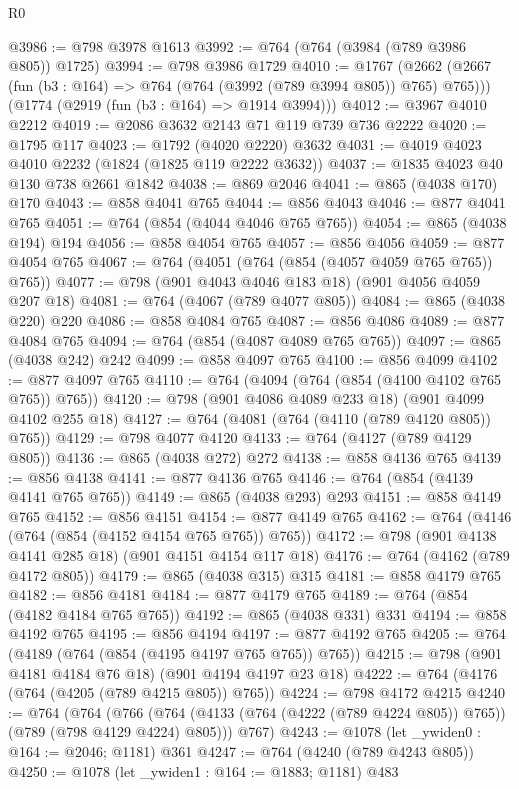 \begin{lexlean}{R0}
\begin{coremodule}
@3986 := @798 @3978 @1613
@3992 := @764 (@764 (@3984 (@789 @3986 @805)) @1725)
@3994 := @798 @3986 @1729
@4010 := @1767
    (@2662 (@2667 (fun (b3 : @164) => @764 (@764 (@3992 (@789 @3994 @805)) @765) @765)))
    (@1774 (@2919 (fun (b3 : @164) => @1914 @3994)))
@4012 := @3967 @4010 @2212
@4019 := @2086 @3632 @2143 @71 @119 @739 @736 @2222
@4020 := @1795 @117
@4023 := @1792 (@4020 @2220) @3632
@4031 := @4019 @4023 @4010 @2232 (@1824 (@1825 @119 @2222 @3632))
@4037 := @1835 @4023 @40 @130 @738 @2661 @1842
@4038 := @869 @2046
@4041 := @865 (@4038 @170) @170
@4043 := @858 @4041 @765
@4044 := @856 @4043
@4046 := @877 @4041 @765
@4051 := @764 (@854 (@4044 @4046 @765 @765))
@4054 := @865 (@4038 @194) @194
@4056 := @858 @4054 @765
@4057 := @856 @4056
@4059 := @877 @4054 @765
@4067 := @764 (@4051 (@764 (@854 (@4057 @4059 @765 @765)) @765))
@4077 := @798 (@901 @4043 @4046 @183 @18) (@901 @4056 @4059 @207 @18)
@4081 := @764 (@4067 (@789 @4077 @805))
@4084 := @865 (@4038 @220) @220
@4086 := @858 @4084 @765
@4087 := @856 @4086
@4089 := @877 @4084 @765
@4094 := @764 (@854 (@4087 @4089 @765 @765))
@4097 := @865 (@4038 @242) @242
@4099 := @858 @4097 @765
@4100 := @856 @4099
@4102 := @877 @4097 @765
@4110 := @764 (@4094 (@764 (@854 (@4100 @4102 @765 @765)) @765))
@4120 := @798 (@901 @4086 @4089 @233 @18) (@901 @4099 @4102 @255 @18)
@4127 := @764 (@4081 (@764 (@4110 (@789 @4120 @805)) @765))
@4129 := @798 @4077 @4120
@4133 := @764 (@4127 (@789 @4129 @805))
@4136 := @865 (@4038 @272) @272
@4138 := @858 @4136 @765
@4139 := @856 @4138
@4141 := @877 @4136 @765
@4146 := @764 (@854 (@4139 @4141 @765 @765))
@4149 := @865 (@4038 @293) @293
@4151 := @858 @4149 @765
@4152 := @856 @4151
@4154 := @877 @4149 @765
@4162 := @764 (@4146 (@764 (@854 (@4152 @4154 @765 @765)) @765))
@4172 := @798 (@901 @4138 @4141 @285 @18) (@901 @4151 @4154 @117 @18)
@4176 := @764 (@4162 (@789 @4172 @805))
@4179 := @865 (@4038 @315) @315
@4181 := @858 @4179 @765
@4182 := @856 @4181
@4184 := @877 @4179 @765
@4189 := @764 (@854 (@4182 @4184 @765 @765))
@4192 := @865 (@4038 @331) @331
@4194 := @858 @4192 @765
@4195 := @856 @4194
@4197 := @877 @4192 @765
@4205 := @764 (@4189 (@764 (@854 (@4195 @4197 @765 @765)) @765))
@4215 := @798 (@901 @4181 @4184 @76 @18) (@901 @4194 @4197 @23 @18)
@4222 := @764 (@4176 (@764 (@4205 (@789 @4215 @805)) @765))
@4224 := @798 @4172 @4215
@4240 := @764
    (@764
      (@766 (@764 (@4133 (@764 (@4222 (@789 @4224 @805)) @765)) (@789 (@798 @4129 @4224) @805)))
      @767)
@4243 := @1078 (let _ywiden0 : @164 := @2046; @1181) @361
@4247 := @764 (@4240 (@789 @4243 @805))
@4250 := @1078 (let _ywiden1 : @164 := @1883; @1181) @483

\end{coremodule}
\end{lexlean}
